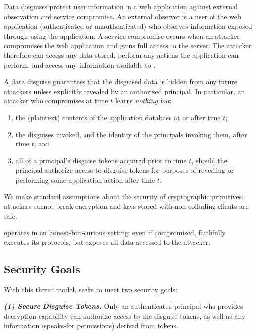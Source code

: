 %
Data disguises protect user information in a web application against external observation
and service compromise.
%
An external observer is a user of the web application (authenticated or unauthenticated) who
observes information exposed through using the application.
%
A service compromise occurs when an attacker compromises the web application and
gains full access to the server.
%
The attacker therefore can access any data stored, perform any actions the application can
perform, and access any information available to \sys.
%

%
A data disguise guarantees that the disguised data is hidden from any future attackers unless
explicitly revealed by an authorized principal.
%
In particular, an attacker who compromises \sys at time $t$ learns \emph{nothing but}:
\begin{enumerate}[nosep]
  \item the (plaintext) contents of the application database at or after time $t$;
  \item the disguises invoked, and the identity of the principals invoking them, after time $t$; and
  \item all of a principal's disguise tokens acquired prior to time $t$, should the principal authorize access to
      disguise tokens for purposes of revealing or performing some application action after time $t$.
\end{enumerate}
%
We make standard assumptions about the security of cryptographic primitives: attackers cannot
break encryption and keys stored with non-colluding clients are safe.
%

%
\sys operates in an honest-but-curious setting: even if compromised, \sys faithfully executes
its protocols, but exposes all data accessed to the attacker.
%

\subsection{Security Goals}
%
With this threat model, \sys seeks to meet two security goals:
%

%
%

\vspace{6pt}\noindent\textbf{\emph{(1) Secure Disguise Tokens.}}
%
Only an authenticated principal who provides decryption capability
 can authorize access to the disguise tokens, as well as any information
(\eg speaks-for permissions) derived from tokens.
%

